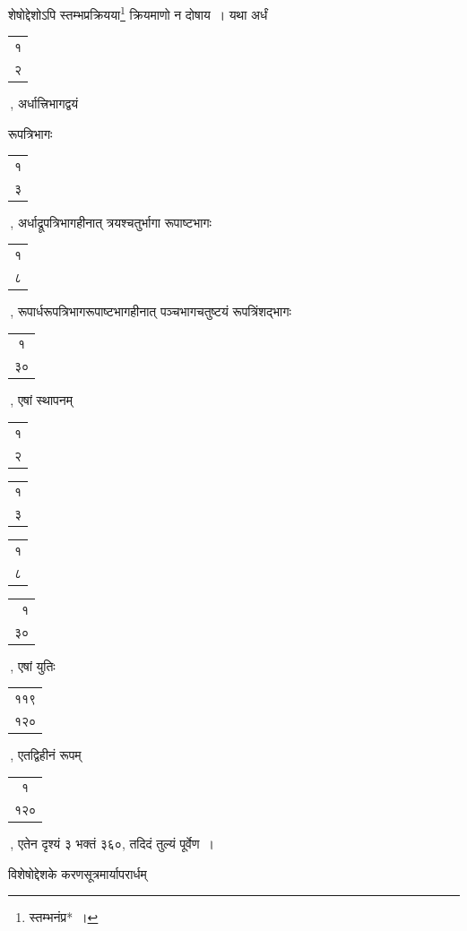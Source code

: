\documentclass[10pt, openany]{book}
\begin{document}
{{{शेषोद्देशोऽपि स्तम्भप्रक्रियया\renewcommand{\thefootnote}{\s ९}\footnote{\s स्तम्भनंप्र*~।} क्रियमाणो न दोषाय~। यथा अर्धं \begin{tabular}{|c|} १\\
२\\\hline \end{tabular}\,, अर्धात्त्रिभागद्वयं}
{रूपत्रिभागः \begin{tabular}{|c|} १\\ ३\\\hline \end{tabular}\,, अर्धाद्रूपत्रिभागहीनात् त्रयश्चतुर्भागा
रूपाष्टभागः \begin{tabular}{|c|} १\\ ८\\\hline \end{tabular}\,, रूपार्धरूपत्रिभागरूपाष्टभागहीनात् पञ्चभागचतुष्टयं रूपत्रिंशद्भागः \begin{tabular}{|c|} १\\ ३०\\\hline \end{tabular}\,, एषां
स्थापनम् \begin{tabular}{|c|} १\\ २\\\hline \end{tabular}\begin{tabular}{r|}१\\ ३\\\hline \end{tabular}\begin{tabular}{r|}१\\ ८\\\hline \end{tabular}\begin{tabular}{r|}१\\ ३०\\\hline \end{tabular}\,, एषां युतिः \begin{tabular}{|c|} ११९\\ १२०\\\hline \end{tabular}\,, एतद्विहीनं रूपम् \begin{tabular}{|c|}१\\ १२०\\\hline \end{tabular}\,, एतेन दृश्यं ३ भक्तं
३६०, तदिदं तुल्यं पूर्वेण~।}
\vspace{4mm}

{विशेषोद्देशके करणसूत्रमार्यापरार्धम्\textemdash}

}}
\end{document}
